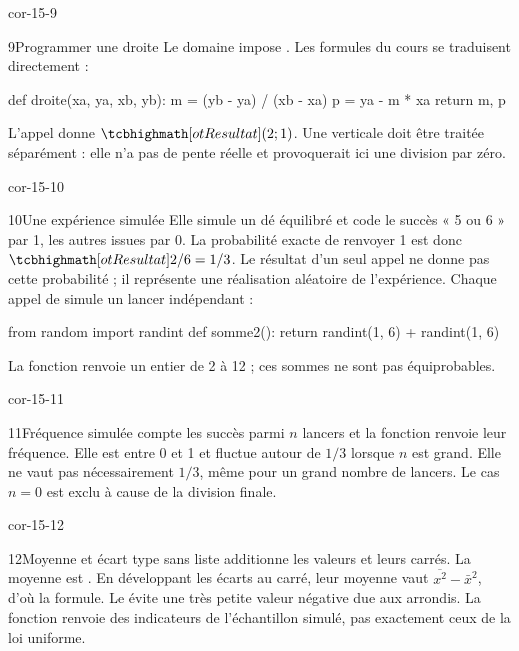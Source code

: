 \begin{blocLivre}{cor-15-9}
\begin{corrige}{9}{Programmer une droite}
Le domaine impose . Les formules du cours se traduisent directement :
\begin{python}
def droite(xa, ya, xb, yb):
    m = (yb - ya) / (xb - xa)
    p = ya - m * xa
    return m, p
\end{python}
L’appel donne $\res{(2;1)}$. Une verticale doit être traitée séparément : elle n’a pas de pente réelle et provoquerait ici une division par zéro.
\end{corrige}
\end{blocLivre}
\begin{blocLivre}{cor-15-10}
\begin{corrige}{10}{Une expérience simulée}
Elle simule un dé équilibré et code le succès « 5 ou 6 » par 1, les autres issues par 0. La probabilité exacte de renvoyer 1 est donc $\res{2/6=1/3}$. Le résultat d’un seul appel ne donne pas cette probabilité ; il représente une réalisation aléatoire de l’expérience. Chaque appel de  simule un lancer indépendant :
\begin{python}
from random import randint
def somme2():
    return randint(1, 6) + randint(1, 6)
\end{python}
La fonction renvoie un entier de 2 à 12 ; ces sommes ne sont pas équiprobables.
\end{corrige}
\end{blocLivre}
\begin{blocLivre}{cor-15-11}
\begin{corrige}{11}{Fréquence simulée}
 compte les succès parmi $n$ lancers et la fonction renvoie leur fréquence. Elle est entre 0 et 1 et fluctue autour de $1/3$ lorsque $n$ est grand. Elle ne vaut pas nécessairement $1/3$, même pour un grand nombre de lancers. Le cas $n=0$ est exclu à cause de la division finale.
\end{corrige}
\end{blocLivre}
\begin{blocLivre}{cor-15-12}
\begin{corrige}{12}{Moyenne et écart type sans liste}
 additionne les valeurs et  leurs carrés. La moyenne est . En développant les écarts au carré, leur moyenne vaut $\overline{x^2}-\bar x^2$, d’où la formule. Le  évite une très petite valeur négative due aux arrondis. La fonction renvoie des indicateurs de l’échantillon simulé, pas exactement ceux de la loi uniforme.
\end{corrige}
\end{blocLivre}
